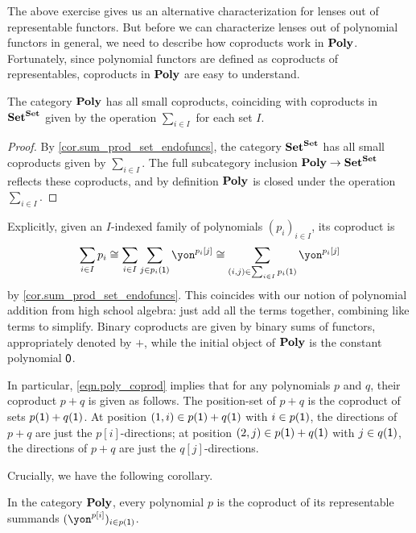 \documentclass[Book-Poly]{subfiles}
\begin{document}
The above exercise gives us an alternative characterization for lenses out of representable functors.
But before we can characterize lenses out of polynomial functors in general, we need to describe how coproducts work in $\mathbf{Poly}$.
Fortunately, since polynomial functors are defined as coproducts of representables, coproducts in $\mathbf{Poly}$ are easy to understand.

\begin{proposition} \label{prop.poly_coprods}
  The category $\mathbf{Poly}$ has all small coproducts, coinciding with coproducts in $\mathbf{Set}^{\mathbf{Set}}$ given by the operation $\sum_{i \in I}$ for each set $I$.
\end{proposition}
\begin{proof}
  By \cref{cor.sum_prod_set_endofuncs}, the category $\mathbf{Set}^{\mathbf{Set}}$ has all small coproducts given by $\sum_{i\in I}$.
  The full subcategory inclusion $\mathbf{Poly}\to \mathbf{Set}^{\mathbf{Set}}$ reflects these coproducts, and by definition $\mathbf{Poly}$ is closed under the operation $\sum_{i \in I}$.
\end{proof}

Explicitly, given an $I$-indexed family of polynomials $(p_i)_{i \in I}$, its coproduct is
\begin{equation} \label{eqn.poly_coprod}
  \sum_{i \in I} p_i \iso \sum_{i \in I} \sum_{j \in p_i(\1)} \yon^{p_i[j]} \iso \sum_{(i,j) \in \sum_{i \in I} p_i(\1)} \yon^{p_i[j]}
\end{equation}
by \cref{cor.sum_prod_set_endofuncs}.
This coincides with our notion of polynomial addition from high school algebra: just add all the terms together, combining like terms to simplify.
Binary coproducts are given by binary sums of functors, appropriately denoted by $+$, while the initial object of $\mathbf{Poly}$ is the constant polynomial $\textsf{0}$.

In particular, \eqref{eqn.poly_coprod} implies that for any polynomials $p$ and $q$, their coproduct $p+q$ is given as follows.
The position-set of $p+q$ is the coproduct of sets $p(\textsf{1}) + q(\textsf{1})$.
At position $(1,i) \in p(\textsf{1}) + q(\textsf{1})$ with $i \in p(\textsf{1})$, the directions of $p+q$ are just the $p[i]$-directions; at position $(2,j) \in p(\textsf{1}) + q(\textsf{1})$ with $j \in q(\textsf{1})$, the directions of $p+q$ are just the $q[j]$-directions.

Crucially, we have the following corollary.

\begin{corollary} \label{cor.poly-coprod-repr}
  In the category $\mathbf{Poly}$, every polynomial $p$ is the coproduct of its representable summands $(\yon^{p[i]})_{i\in p(\1)}$.
\end{corollary}
\end{document}

